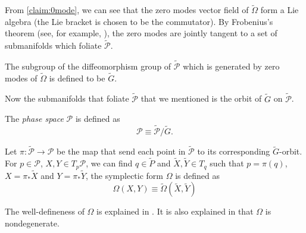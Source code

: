 \documentclass[10pt]{article}
\begin{document}
From \cref{claim:0mode}, we can see that the zero modes vector field of $\widetilde{\Omega}$ form a Lie algebra (the Lie bracket is chosen to be the commutator).
By Frobenius's theorem (see, for example, \cite{Wald:1984rg}), the zero modes are jointly tangent to a set of submanifolds which foliate $\widetilde{\mathcal{P}}$.
\begin{definition}
    The subgroup of the diffeomorphism group of $\widetilde{\mathcal{P}}$ which is generated by zero modes of $\widetilde{\Omega}$ is defined to be $\widetilde{G}$.
\end{definition}
Now the submanifolds that foliate $\widetilde{\mathcal{P}}$ that we mentioned is the orbit of $\widetilde{G}$ on $\widetilde{\mathcal{P}}$.
\begin{definition}
    The \textit{phase space} $\mathcal{P}$ is defined as
    \begin{equation}
        \mathcal{P}\equiv\widetilde{\mathcal{P}}/\widetilde{G}.
    \end{equation}
\end{definition}
\begin{definition}\label{def:sym_form}
    Let $\pi:\widetilde{\mathcal{P}}\to\mathcal{P}$ be the map that send each point in $\widetilde{\mathcal{P}}$ to its corresponding $\widetilde{G}$-orbit.
    For $p\in\mathcal{P}$, $X,Y\in T_p\mathcal{P}$, we can find $q\in\widetilde{P}$ and $\widetilde{X},\widetilde{Y}\in T_q$ such that $p=\pi(q)$, $X=\pi_\ast\widetilde{X}$ and $Y=\pi_\ast\widetilde{Y}$, the symplectic form $\Omega$ is defined as 
    \begin{equation}
        \Omega(X,Y)\equiv\widetilde{\Omega}\left(\widetilde{X},\widetilde{Y}\right)
    \end{equation}
\end{definition}
\begin{remark}
    The well-defineness of $\Omega$ is explained in \cite{Harlow:2019yfa}.
    It is also explained in \cite{Harlow:2019yfa} that $\Omega$ is nondegenerate.
\end{remark}
\end{document}
